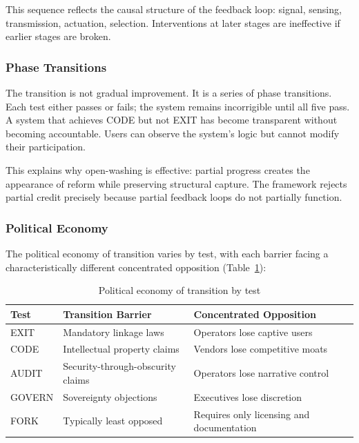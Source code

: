 \documentclass{article}
\begin{document}
This sequence reflects the causal structure of the feedback loop: signal, sensing, transmission, actuation, selection. Interventions at later stages are ineffective if earlier stages are broken.

\subsubsection{Phase Transitions}

The transition is not gradual improvement. It is a series of phase transitions. Each test either passes or fails; the system remains incorrigible until all five pass. A system that achieves CODE but not EXIT has become transparent without becoming accountable. Users can observe the system's logic but cannot modify their participation.

This explains why open-washing is effective: partial progress creates the appearance of reform while preserving structural capture. The framework rejects partial credit precisely because partial feedback loops do not partially function.

\subsubsection{Political Economy}

The political economy of transition varies by test, with each barrier facing a characteristically different concentrated opposition (Table~\ref{tab:political-economy}):

\begin{table}[h]
\centering
\caption{Political economy of transition by test}
\label{tab:political-economy}
\begin{tabular}{lll}
\hline
\textbf{Test} & \textbf{Transition Barrier} & \textbf{Concentrated Opposition} \\
\hline
EXIT & Mandatory linkage laws & Operators lose captive users \\
CODE & Intellectual property claims & Vendors lose competitive moats \\
AUDIT & Security-through-obscurity claims & Operators lose narrative control \\
GOVERN & Sovereignty objections & Executives lose discretion \\
FORK & Typically least opposed & Requires only licensing and documentation \\
\hline
\end{tabular}
\end{table}
\end{document}

